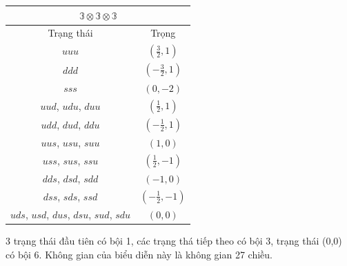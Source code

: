 \documentclass{report}
\begin{document}
	\begin{center}
		\begin{tabular}{ |c|c| }
			\hline
				\multicolumn{2}{|c|}{\( \mathbb{3} \otimes \mathbb{3} \otimes \mathbb{3} \)} \\
			\hline	
 				Trạng thái & Trọng \\
 			\hline
 				\( uuu \) & \( \left( \frac{3}{2}, 1 \right) \) \\ 	
			\hline
 				\( ddd \) & \( \left( - \frac{3}{2}, 1 \right) \) \\ 	
			\hline
				\( sss \) & \( \left( 0, - 2 \right) \) \\ 	
			\hline
				\( uud \), \( udu \), \( duu \) & \( \left( \frac{1}{2}, 1 \right) \) \\ 	
			\hline
				\( udd \), \( dud \), \( ddu \) & \( \left( - \frac{1}{2}, 1 \right) \) \\ 	
	
			\hline
				\( uus \), \( usu \), \( suu \) & \( \left( 1, 0 \right) \) \\ 	
			\hline
				\( uss \), \( sus \), \( ssu \) & \( \left( \frac{1}{2}, - 1 \right) \) \\ 	
			\hline
				\( dds \), \( dsd \), \( sdd \) & \( \left( - 1, 0 \right) \) \\ 	
			\hline
				\( dss \), \( sds \), \( ssd \) & \( \left( - \frac{1}{2}, - 1 \right) \) \\ 	
			\hline
				\( uds \), \( usd \), \( dus \), \( dsu \), \( sud \), \( sdu \) & \( \left( 0, 0 \right) \) \\ 	
			\hline
		\end{tabular}
	\end{center}

3 trạng thái đầu tiên có bội 1, các trạng thá tiếp theo có bội 3, trạng thái (0,0) có bội 6. Không gian của biểu diễn này là không gian 27 chiều.		
\end{document}

